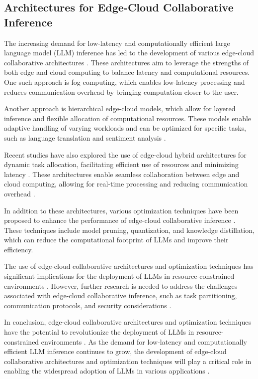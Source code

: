 \documentclass[11pt,a4paper]{article}
\begin{document}
\subsection{Architectures for Edge-Cloud Collaborative Inference}


The increasing demand for low-latency and computationally efficient large language model (LLM) inference has led to the development of various edge-cloud collaborative architectures \cite{doi:10.3390/electronics12173598}. These architectures aim to leverage the strengths of both edge and cloud computing to balance latency and computational resources. One such approach is fog computing, which enables low-latency processing and reduces communication overhead by bringing computation closer to the user. 

Another approach is hierarchical edge-cloud models, which allow for layered inference and flexible allocation of computational resources. These models enable adaptive handling of varying workloads and can be optimized for specific tasks, such as language translation and sentiment analysis \cite{doi:10.1145/3575693.3575698}.

Recent studies have also explored the use of edge-cloud hybrid architectures for dynamic task allocation, facilitating efficient use of resources and minimizing latency \cite{arxiv:2405.14636}. These architectures enable seamless collaboration between edge and cloud computing, allowing for real-time processing and reducing communication overhead \cite{arxiv:2410.00531}.

In addition to these architectures, various optimization techniques have been proposed to enhance the performance of edge-cloud collaborative inference \cite{arxiv:2404.14294}. These techniques include model pruning, quantization, and knowledge distillation, which can reduce the computational footprint of LLMs and improve their efficiency.

The use of edge-cloud collaborative architectures and optimization techniques has significant implications for the deployment of LLMs in resource-constrained environments \cite{doi:10.1109/comst.2025.3527641}. However, further research is needed to address the challenges associated with edge-cloud collaborative inference, such as task partitioning, communication protocols, and security considerations \cite{arxiv:2402.06196}.

In conclusion, edge-cloud collaborative architectures and optimization techniques have the potential to revolutionize the deployment of LLMs in resource-constrained environments \cite{doi:10.1109/mnet.2025.3539338}. As the demand for low-latency and computationally efficient LLM inference continues to grow, the development of edge-cloud collaborative architectures and optimization techniques will play a critical role in enabling the widespread adoption of LLMs in various applications \cite{doi:10.1007/s42452-025-07668-w}.
\end{document}
